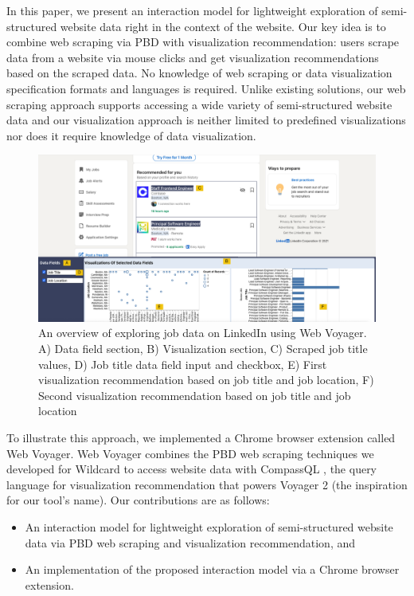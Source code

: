 \documentclass{vgtc}                          %
\begin{document}
In this paper, we present an interaction model for lightweight exploration of semi-structured website data right in the context of the website. Our key idea is to combine web scraping via PBD with visualization recommendation: users scrape data from a website via mouse clicks and get visualization recommendations based on the scraped data. No knowledge of web scraping or data visualization specification formats and languages is required. Unlike existing solutions, our web scraping approach supports accessing a wide variety of semi-structured website data and our visualization approach is neither limited to predefined visualizations nor does it require knowledge of data visualization.

\begin{figure}
  \includegraphics[width=\textwidth]{figures/example}
  \caption{\label{fig:example}An overview of exploring job data on LinkedIn using Web Voyager. A) Data field section, B) Visualization section, C) Scraped job title values, D) Job title data field input and checkbox, E) First visualization recommendation based on job title and job location, F) Second visualization recommendation based on job title and job location}
  \label{fig:example}
\end{figure}


To illustrate this approach, we implemented a Chrome browser extension called Web Voyager. Web Voyager combines the PBD web scraping techniques we developed for Wildcard \cite{litt2020} to access website data with CompassQL \cite{wongsuphasawat2016}, the query language for visualization recommendation that powers Voyager 2 \cite{wongsuphasawat2017} (the inspiration for our tool’s name). Our contributions are as follows:

\begin{itemize}
 \item An interaction model for lightweight exploration of semi-structured website data via PBD web scraping and visualization recommendation, and
 \item An implementation of the proposed interaction model via a Chrome browser extension.
\end{itemize}
\end{document}
